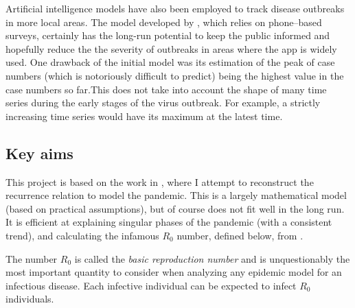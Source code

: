 Artificial intelligence models have also been employed to track disease outbreaks in more local areas. The model developed by \cite{SrinivasaRao2020}, which relies on phone–based surveys, certainly has the long-run potential to keep the public informed and hopefully reduce the the severity of outbreaks in areas where the app is widely used. One drawback of the initial model was its estimation of the peak of case numbers (which is notoriously difficult to predict) being the highest value in the case numbers so far.This does not take into account the shape of many time series during the early stages of the virus outbreak. For example, a strictly increasing time series would have its maximum at the latest time.


\subsection{Key aims}

This project is based on the work in \cite{grigor20}, where I attempt to reconstruct the recurrence relation to model the pandemic. This is a largely mathematical model (based on practical assumptions), but of course does not fit well in the long run. It is efficient at explaining singular phases of the pandemic (with a consistent trend), and calculating the infamous $R_0$ number, defined below, from \cite{epid08}. 

\begin{ndefinition} 
The number $R_0$ is called
the \textit{basic reproduction number} and is unquestionably the most important quantity to consider when analyzing any epidemic model for an infectious disease. Each infective individual can be expected to infect $R_0$ individuals. 
\end{ndefinition}

